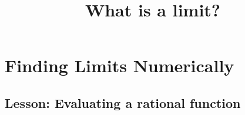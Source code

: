 \documentclass{ximera}
\title{What is a limit?}
\begin{document}
\begin{abstract}
\end{abstract}

\section{Finding Limits Numerically}
\subsection{Lesson: Evaluating a rational function}
\begin{center}
\end{center}
\end{document}
